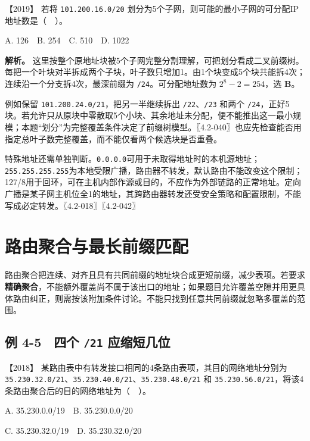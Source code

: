\noindent{}【2019】 若将 \texttt{101.200.16.0/20} 划分为5个子网，则可能的最小子网的可分配IP地址数是（　）。

A. 126　B. 254　C. 510　D. 1022


\textbf{解析。} 这里按整个原地址块被5个子网完整分割理解，可把划分看成二叉前缀树。每把一个叶块对半拆成两个子块，叶子数只增加1。由1个块变成5个块共能拆4次；连续沿一个分支拆4次，最深前缀为 \texttt{/24}。可分配地址数为 \(2^8-2=254\)，选 \textbf{B}。

例如保留 \texttt{101.200.24.0/21}，把另一半继续拆出 \texttt{/22}、\texttt{/23} 和两个 \texttt{/24}，正好5块。若允许只从原块中零散取5个小块、其余地址未分配，便不能推出这一最小规模；本题``划分''为完整覆盖条件决定了前缀树模型。〖4.2-040〗也应先检查能否用指定总叶子数完整覆盖，而不能仅看两个候选块是否重叠。

特殊地址还需单独判断。\texttt{0.0.0.0}可用于未取得地址时的本机源地址；\texttt{255.255.255.255}为本地受限广播，路由器不转发，默认路由不能改变这个限制；127/8用于回环，可在主机内部作源或目的，不应作为外部链路的正常地址。定向广播是某子网主机位全1的地址，其跨路由器转发还受安全策略和配置限制，不能写成必定转发。〖4.2-018〗〖4.2-042〗

\section{路由聚合与最长前缀匹配}\label{cn-04-09}

路由聚合把连续、对齐且具有共同前缀的地址块合成更短前缀，减少表项。若要求\textbf{精确聚合}，不能额外覆盖尚不属于该出口的地址；如果题目允许覆盖空隙并用更具体路由纠正，则需按该附加条件讨论。不能只找到任意共同前缀就忽略多覆盖的范围。

\subsection{\texorpdfstring{例 4-5　四个 \texttt{/21} 应缩短几位}{例 4-5　四个 /21 应缩短几位}}\label{cn-ex4-5}

\noindent{}【2018】 某路由表中有转发接口相同的4条路由表项，其目的网络地址分别为 \texttt{35.230.32.0/21}、\texttt{35.230.40.0/21}、\texttt{35.230.48.0/21} 和 \texttt{35.230.56.0/21}，将该4条路由聚合后的目的网络地址为（　）。

A. 35.230.0.0/19　B. 35.230.0.0/20

C. 35.230.32.0/19　D. 35.230.32.0/20


